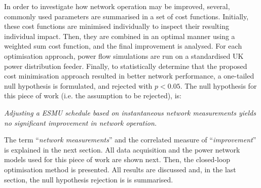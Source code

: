 In order to investigate how network operation may be improved, several, commonly used parameters are summarised in a set of cost functions.
Initially, these cost functions are minimised individually to inspect their resulting individual impact.
Then, they are combined in an optimal manner using a weighted sum cost function, and the final improvement is analysed.
For each optimisation approach, power flow simulations are run on a standardised UK power distribution feeder.
Finally, to statistically determine that the proposed cost minimisation approach resulted in better network performance, a one-tailed null hypothesis is formulated, and rejected with $p<0.05$.
The null hypothesis for this piece of work (i.e. the assumption to be rejected), is:

\textit{Adjusting a ESMU schedule based on instantaneous network measurements yields no significant improvement in network operation.}

The term ``\textit{network measurements}'' and the correlated measure of ``\textit{improvement}'' is explained in the next section.
All data acquisition and the power network models used for this piece of work are shown next.
Then, the closed-loop optimisation method is presented.
All results are discussed and, in the last section, the null hypothesis rejection is is summarised.
